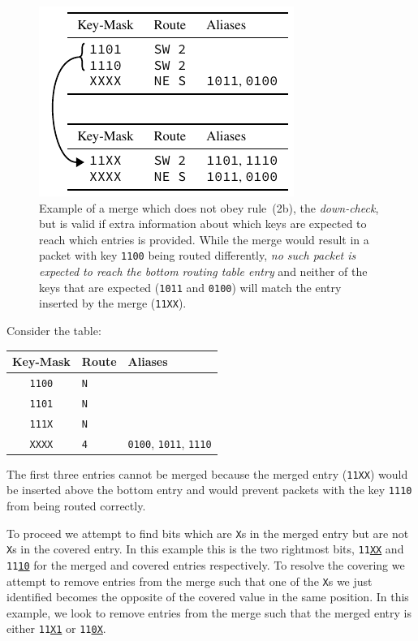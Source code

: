 \documentclass[conference]{IEEEtran}
\newcommand{\mytt}[1]{\texttt{\footnotesize#1}}
\begin{document}
  \begin{figure}
    \centering
    \includegraphics{figures/aliases_example}
    \caption{
      Example of a merge which does not obey rule~(2b), the \textit{down-check}, but is valid if extra information about which keys are expected to reach which entries is provided.
      While the merge would result in a packet with key \mytt{1100} being routed differently, \textit{no such packet is expected to reach the bottom routing table entry} and neither of the keys that are expected (\mytt{1011} and \mytt{0100}) will match the entry inserted by the merge (\mytt{11XX}).
    }
    \label{fig:algorithm/rule2b'_example}
  \end{figure}

  Consider the table:

  \begin{table}[H]
    \centering
    \begin{tabular}{c l l}
      \toprule
      Key-Mask & Route & Aliases \\
      \midrule
      \texttt{1100} & \texttt{N} \\
      \texttt{1101} & \texttt{N} \\
      \texttt{111X} & \texttt{N} \\
      \texttt{XXXX} & \texttt{4} & \texttt{0100}, \texttt{1011}, \texttt{1110} \\
      \bottomrule
    \end{tabular}
  \end{table}

  The first three entries cannot be merged because the merged entry (\mytt{11XX}) would be inserted above the bottom entry and would prevent packets with the key \mytt{1110} from being routed correctly.

  To proceed we attempt to find bits which are \mytt{X}s in the merged entry but are not \mytt{X}s in the covered entry.
  In this example this is the two rightmost bits, \mytt{11\underline{XX}} and \mytt{11\underline{10}} for the merged and covered entries respectively.
  To resolve the covering we attempt to remove entries from the merge such that one of the \mytt{X}s we just identified becomes the opposite of the covered value in the same position.
  In this example, we look to remove entries from the merge such that the merged entry is either \mytt{11\underline{X1}} or \mytt{11\underline{0X}}.
\end{document}
